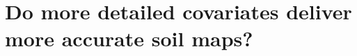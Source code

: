 \artigotrue
\chapter{Do more detailed covariates deliver more accurate soil maps?}
\label{chap:chap05}

\def\elev{\texttt{ELEV}} %
\def\slp{\texttt{SLP}}   %
\def\asp{\texttt{ASP}}   %
\def\nor{\texttt{NOR}}   %
\def\acc{\texttt{ACC}}   %
\def\twi{\texttt{TWI}}   %
\def\spi{\texttt{SPI}}   %
\def\tpi{\texttt{TPI}}   %
\def\ndvi{\texttt{NDVI}} %
\def\savi{\texttt{SAVI}} %
\def\sibcs{Brazilian System of Soil Classification}

\def\portuguesekeys{Mapeamento Digital do Solo, Modelo Linear Misto, Informação Auxiliar, Seleção de Variáveis,
Acurácia do Modelo, Custo do Mapeamento do Solo}

